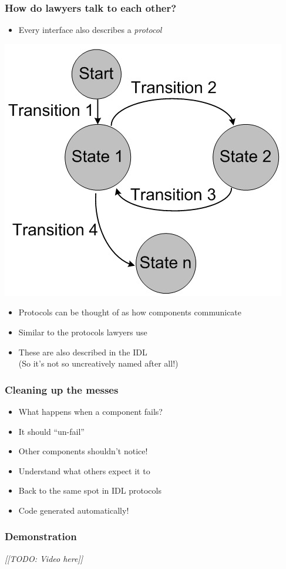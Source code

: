 \documentclass[bigger]{beamer}
\newcommand{\todo}[1] {\textit{[[TODO: #1]]}}
\begin{document}
\begin{frame}
\frametitle{How do lawyers talk to each other?}
\label{sec-9}

\begin{itemize}
\item Every interface also describes a \emph{protocol}
\end{itemize}
\includegraphics[scale=0.25]{../pictures/fsm.jpg}
\begin{itemize}
\item Protocols can be thought of as how components communicate
\item Similar to the protocols lawyers use
\item These are also described in the IDL \\ (So it's not so uncreatively named after all!)
\end{itemize}
\end{frame}
\begin{frame}
\frametitle{Cleaning up the messes}
\label{sec-10}

\begin{itemize}
\item What happens when a component fails?
\item It should ``un-fail''
\item Other components shouldn't notice!
\item Understand what others expect it to
\item Back to the same spot in IDL protocols
\item Code generated automatically!
\end{itemize}
\end{frame}
\begin{frame}
\frametitle{Demonstration}
\label{sec-11}

\todo{Video here}
\end{frame}
\end{document}
